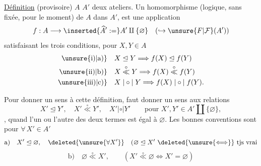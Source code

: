 
\uline{Définition} (provisoire)  $A$ $A'$ deux ateliers. Un  homomorphisme (logique, sans   fixée, pour le moment) de $A$ dans $A'$, est une application 
\[
f:A\longrightarrow\inserted{\widehat{A}':=}A'\amalg\{\varnothing\}\quad(\hookrightarrow\unsure{F|\mathcal{F}}(A'))
\]
satisfaisant les trois conditions, pour $X,Y\in A$
\[
\begin{aligned}
\text{\unsure{i)|a)}}\quad &X\trianglelefteq Y\Longrightarrow f(X)\trianglelefteq f(Y)\\
\text{\unsure{ii)|b)}}\quad &X\overset{\circ}{\ll}Y\Longrightarrow f(X)\overset{\circ}{\ll}f(Y)\\
\text{\unsure{iii)|c)}}\quad &X\mathrel{|\circ|}Y\Longrightarrow f(X)\mathrel{|\circ|}f(Y).
\end{aligned}
\]

Pour donner un sens à cette définition, faut donner un sens aux relations
\[
X'\trianglelefteq Y',\quad X'\overset{\circ}{\ll}Y',\quad X'\mathrel{|\circ|}Y'\qquad\text{pour }X',Y'\in A'\amalg\{\varnothing\},
\]
, quand l'un ou l'autre des deux termes est \deleted{$\{\varnothing\}$} égal à $\varnothing$. Les bonnes conventions sont pour $\forall\,X'\in A'$
\[
\text{a)}\quad X'\trianglelefteq\varnothing,\quad
\deleted{\unsure{\forall X'}}\quad
(\varnothing\trianglelefteq X'\ \deleted{\unsure{\Longleftrightarrow}}\ \text{tjs vrai}
\]
\[
\text{b)}\quad\varnothing\overset{\circ}{\ll}X',\qquad
(X'\overset{\circ}{\ll}\varnothing\Longleftrightarrow X'=\varnothing)
\]
